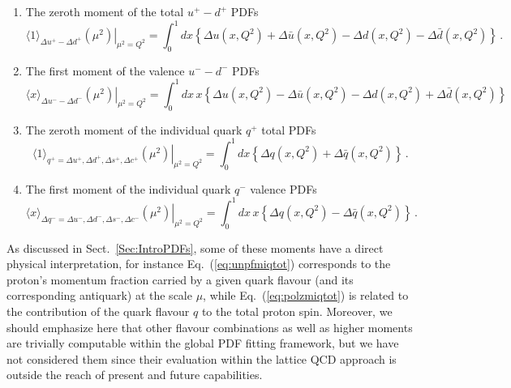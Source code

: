 \begin{itemize}
\begin{enumerate}
\item The zeroth moment of the total $u^+-d^+$ PDFs
\begin{equation}
\left.\langle 1 \rangle_{\Delta u^+-\Delta d^+}(\mu^2)\right|_{\mu^2=Q^2}
=
\int_0^1 dx \left\{\Delta u(x,Q^2)+\Delta\bar{u}(x,Q^2)-\Delta d(x,Q^2)-\Delta\bar{d}(x,Q^2)\right\} \, .
\label{eq:polzmumdtot}
\end{equation}

\item The first moment of the valence $u^--d^-$ PDFs
\begin{equation}
\left.\langle x\rangle_{\Delta u^--\Delta d^-}(\mu^2)\right|_{\mu^2=Q^2}
=
\int_0^1 dx\, x\left\{\Delta u(x,Q^2)-\Delta\bar{u}(x,Q^2)-\Delta d(x,Q^2)+\Delta \bar{d}(x,Q^2)\right\}
\label{eq:polfmumdval}  
\end{equation}

\item The zeroth moment of the individual quark $q^+$ total PDFs
\begin{equation}
\left.\langle 1\rangle_{q^+=\Delta u^+,\Delta d^+,\Delta s^+,\Delta c^+}(\mu^2)\right|_{\mu^2=Q^2}
=
\int_0^1 dx \left\{\Delta q(x,Q^2)+\Delta\bar{q}(x,Q^2)\right\} \, .
\label{eq:polzmiqtot}
\end{equation}

\item The first moment of the individual quark $q^-$ valence PDFs
\begin{equation}
\left.\langle x\rangle_{\Delta q^-=\Delta u^-,\Delta d^-,\Delta s^-,\Delta c^-}(\mu^2)\right|_{\mu^2=Q^2}
=
\int_0^1 dx\, x\left\{\Delta q(x,Q^2)-\Delta\bar{q}(x,Q^2)\right\} \, .
\label{eq:polfmiqval}
\end{equation}

\end{enumerate}

\end{itemize}

As discussed in Sect.~\ref{Sec:IntroPDFs}, some of these moments have a direct
physical interpretation, for instance Eq.~(\ref{eq:unpfmiqtot}) corresponds
to the proton's momentum fraction carried by a given quark flavour (and its
corresponding antiquark) at the scale $\mu$, while
Eq.~(\ref{eq:polzmiqtot}) is related to the contribution of the quark flavour
$q$ to the total proton spin.
%
Moreover, we should emphasize here that other flavour combinations as well as higher
moments are trivially computable within the global PDF fitting framework,
but we have not considered them since their evaluation within the lattice
QCD approach is outside the reach of present and future capabilities.













